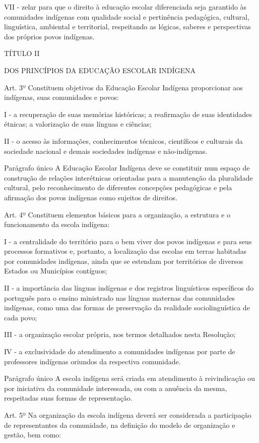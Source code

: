 \documentclass[
]{book}
\begin{document}
VII - zelar para que o direito à educação escolar diferenciada seja garantido às comunidades indígenas com qualidade social e pertinência pedagógica, cultural, linguística, ambiental e territorial, respeitando as lógicas, saberes e perspectivas dos próprios povos indígenas.

TÍTULO II

DOS PRINCÍPIOS DA EDUCAÇÃO ESCOLAR INDÍGENA

Art. 3º Constituem objetivos da Educação Escolar Indígena proporcionar aos indígenas, suas comunidades e povos:

I - a recuperação de suas memórias históricas; a reafirmação de suas identidades étnicas; a valorização de suas línguas e ciências;

II - o acesso às informações, conhecimentos técnicos, científicos e culturais da sociedade nacional e demais sociedades indígenas e não-indígenas.

Parágrafo único A Educação Escolar Indígena deve se constituir num espaço de construção de relações interétnicas orientadas para a manutenção da pluralidade cultural, pelo reconhecimento de diferentes concepções pedagógicas e pela afirmação dos povos indígenas como sujeitos de direitos.

Art. 4º Constituem elementos básicos para a organização, a estrutura e o funcionamento da escola indígena:

I - a centralidade do território para o bem viver dos povos indígenas e para seus processos formativos e, portanto, a localização das escolas em terras habitadas por comunidades indígenas, ainda que se estendam por territórios de diversos Estados ou Municípios contíguos;

II - a importância das línguas indígenas e dos registros linguísticos específicos do português para o ensino ministrado nas línguas maternas das comunidades indígenas, como uma das formas de preservação da realidade sociolinguística de cada povo;

III - a organização escolar própria, nos termos detalhados nesta Resolução;

IV - a exclusividade do atendimento a comunidades indígenas por parte de professores indígenas oriundos da respectiva comunidade.

Parágrafo único A escola indígena será criada em atendimento à reivindicação ou por iniciativa da comunidade interessada, ou com a anuência da mesma, respeitadas suas formas de representação.

Art. 5º Na organização da escola indígena deverá ser considerada a participação de representantes da comunidade, na definição do modelo de organização e gestão, bem como:
\end{document}
